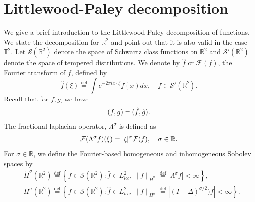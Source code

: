 \documentclass[twoside, reqno]{amsart}
\numberwithin{lemma}{section}
\numberwithin{theorem}{section}
\numberwithin{proposition}{section}
\numberwithin{equation}{section} %
\newcommand{\Hdot}{\dot{H}}
\newcommand{\Sob}[2]{\lVert#1\rVert_{#2}}
\newcommand{\RR}{\mathbb{R}}
\newcommand{\Lam}{\Lambda}
\newcommand{\si}{\sigma}
\begin{document}
\section{Littlewood-Paley decomposition}\label{sect:appendix} We give a brief introduction to the Littlewood-Paley decomposition of functions. We state the decomposition for $\mathbb{R}^2$ and point out that it is also valid in the case $\mathbb{T}^2$.
Let $\mathscr{S}(\RR^2)$ denote the space of Schwartz class functions on $\RR^2$ and $\mathscr{S}'(\RR^2)$ denote the space of tempered distributions. We denote by $\hat{f}$ or $\mathcal{F}(f)$, the Fourier transform of $f$, defined by
	\[\hat{f}(\xi)\overset{\text{def}}{=}\int e^{-2\pi i x\cdot \xi}f(x)dx,\quad f\in\mathscr{S}'(\RR^2).\] 
    Recall that for $f,g$, we have
	    \begin{align}\notag
	        (f,g)=(\hat{f},\hat{g}).
	    \end{align}
	The fractional laplacian operator, $\Lam^\si$ is defined as
	    \begin{align}\notag
	        \mathcal{F}(\Lam^\si f)(\xi)=|\xi|^\si\mathcal{F}(f),\quad \si\in\RR.
	    \end{align} 
     For $\si \in \mathbb{R}$, we define the Fourier-based homogeneous and inhomogeneous Sobolev spaces by
	    \begin{align}
	        &\Hdot^\si(\mathbb{R}^2)\overset{\text{def}}{=}\left\{f\in \mathscr{S}(\RR^2):\hat{f}\in L^2_{loc}, \Sob{f}{\Hdot^\si}\overset{\text{def}}{=}|\Lam^\si f|<\infty\right\},\label{def:hom:Sob:norm}\\
	        &H^\si(\mathbb{R}^2)\overset{\text{def}}{=}\left\{f\in \mathscr{S}(\RR^2):\hat{f}\in L^2_{loc}, \Sob{f}{H^\si}\overset{\text{def}}{=}|(I-\Delta)^{\si/2}) f|<\infty\right\}.\label{def:inhom:Sob:norm}
	    \end{align}
\end{document}
